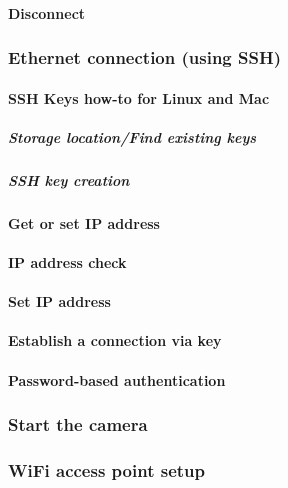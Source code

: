\paragraph{Disconnect}
\subsubsection{Ethernet connection (using SSH)}
\paragraph{SSH Keys how-to for Linux and Mac}
\subparagraph{Storage location/Find existing keys}
\subparagraph{SSH key creation}
\paragraph{Get or set IP address}
\paragraph{IP address check}
\paragraph{Set IP address}
\paragraph{Establish a connection via key}
\paragraph{Password-based authentication}
\subsubsection{Start the camera}
\subsubsection{WiFi access point setup}
